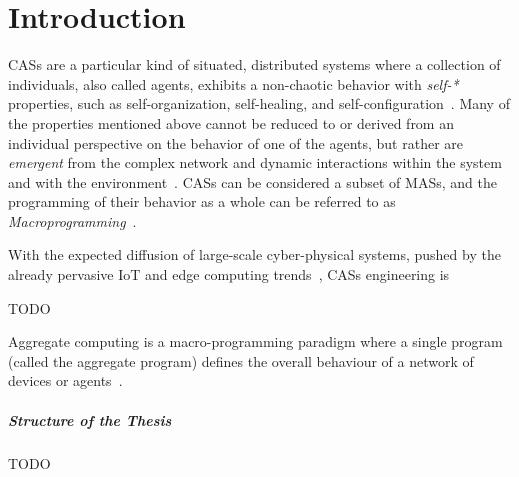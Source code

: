 \chapter{Introduction}
\label{chap:introduction}
\acp{CAS} are a particular kind of situated, distributed systems where a collection of individuals, also called agents, exhibits a non-chaotic behavior with \textit{self-*} properties, such as self-organization, self-healing, and self-configuration~\cite{macroprogramming-state-of-the-art}.
%
Many of the properties mentioned above cannot be reduced to or derived from an individual perspective on the behavior of one of the agents, but rather are \textit{emergent} from the complex network and dynamic interactions within the system and with the environment~\cite{macroprogramming-state-of-the-art}.
%
\acp{CAS} can be considered a subset of \acp{MAS}, and the programming of their behavior as a whole can be referred to as \textit{Macroprogramming}~\cite{macroprogramming-state-of-the-art}.

With the expected diffusion of large-scale cyber-physical systems, pushed by the already pervasive \ac{IoT} and edge computing trends~\cite{scafi}, \acp{CAS} engineering is 

TODO


Aggregate computing is a macro-programming paradigm where a single program (called the aggregate program) defines the overall behaviour of a network of devices or agents~\cite{macroprogramming-state-of-the-art}.

\paragraph{Structure of the Thesis}

TODO
